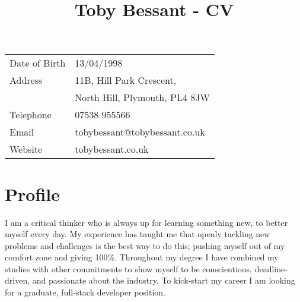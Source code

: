 \documentclass[1pt]{article}
\title{\bfseries\Huge Toby Bessant - CV\vspace{-1.5em}}
\date{}
\begin{document}
\maketitle
\begin{center}
\begin{tabular}[]{ll}
Date of Birth & 13/04/1998\\
Address        & 11B, Hill Park Crescent,\\ & North Hill, Plymouth, PL4 8JW \\ 
Telephone     &07538 955566\\
Email            & tobybessant@tobybessant.co.uk\\
Website        & tobybessant.co.uk\\
\end{tabular}
\end{center}
 
\section*{Profile}
I am a critical thinker who is always up for learning something new, to better myself every day. My experience has taught me that openly tackling new problems 
and challenges is the best way to do this; pushing myself out of my comfort zone and giving 100\%. Throughout my degree I have combined my studies with 
other commitments to show myself to be conscientious, deadline-driven, and passionate about the industry. To kick-start my career I am looking for a graduate, 
full-stack developer position.
 
\end{document}
